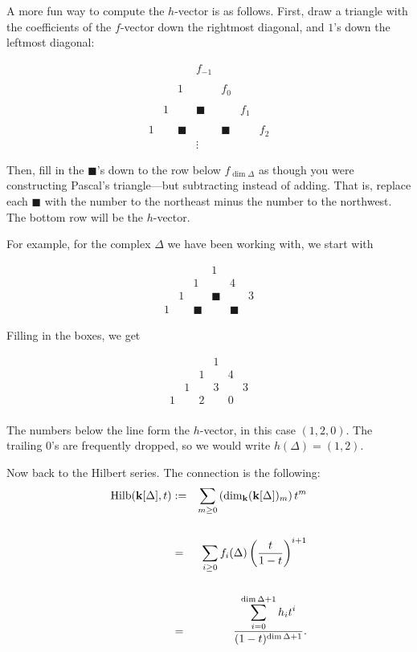 \documentclass{amsart}
\newcommand{\BS}{\blacksquare}
\newcommand{\Hilb}{\mathop{\rm Hilb}\nolimits}
\newcommand{\fld}{{\bf k}}
\begin{document}
A more fun way to compute the $h$-vector is as follows.  First, draw a triangle with the
coefficients of the $f$-vector down the rightmost diagonal, and $1$'s down the leftmost
diagonal:

	$$\begin{array}{ccccccc}
	  &   &     & f_{-1} &     &     & \\ \\
	  &   &   1 &        & f_0 &     & \\ \\
	  & 1 &     & \BS    &     & f_1 & \\ \\
	1 &   & \BS &        & \BS &     & f_2 \\
	  &   &     & \vdots &     &     &
	\end{array}$$

Then, fill in the $\BS$'s down to the row below $f_{\dim\Delta}$ as though you were
constructing Pascal's triangle---but subtracting instead of adding.  That is, replace each
$\BS$ with the number to the northeast minus the number to the northwest.  The bottom row will
be the $h$-vector.

For example, for the complex $\Delta$ we have been working with, we start with

	$$\begin{array}{cccccc}
	  &   &     & 1   &     & \\
	  &   & 1   &     & 4   & \\
	  & 1 &     & \BS &     & 3 \\ \hline
	1 &   & \BS &     & \BS &
	\end{array}$$

Filling in the boxes, we get

	$$\begin{array}{cccccc}
	  &   &   & 1 &   & \\
	  &   & 1 &   & 4 & \\
	  & 1 &   & 3 &   & 3 \\ \hline
	1 &   & 2 &   & 0 & \\
	\end{array}$$

The numbers below the line form the $h$-vector, in this case $(1,2,0)$.  The trailing $0$'s
are frequently dropped, so we would write $h(\Delta)=(1,2)$.

Now back to the Hilbert series.  The connection is the following:
	\begin{eqnarray*}
	\Hilb(\fld[\Delta],t) &:=&
	\sum_{m \geq 0} \left( \dim_\fld (\fld[\Delta])_m \right) t^m \\ \\
	&=& \sum_{i \geq 0} f_i(\Delta) \left(\frac{t}{1-t}\right)^{i+1} \\ \\
	&=& \frac {\displaystyle\sum_{i=0}^{\dim\Delta+1} h_it^i} {(1-t)^{\dim\Delta+1}}.
	\end{eqnarray*}
\end{document}
